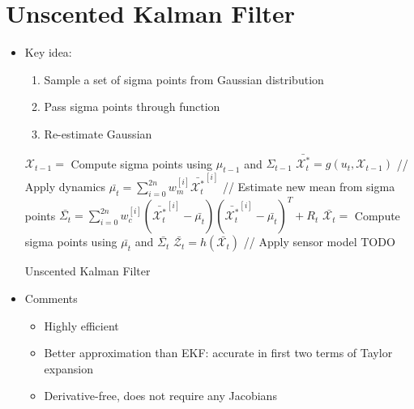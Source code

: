 \documentclass[../main.tex]{subfiles}
\begin{document}
\section{Unscented Kalman Filter}
  \begin{itemize}
    \item Key idea:
      \begin{enumerate}
        \item Sample a set of sigma points from Gaussian distribution
        \item Pass sigma points through function
        \item Re-estimate Gaussian
      \end{enumerate}
    \begin{algorithm}[H]
        \SetAlgoLined
        $\mathcal{X}_{t-1} = $ Compute sigma points using $\mu_{t-1}$ and $\Sigma_{t-1}$\;
        $\bar{\mathcal{X}_{t}^{*}} = g(u_{t}, \mathcal{X}_{t-1})$ // Apply dynamics \;
        $\bar{\mu_{t}} = \sum_{i=0}^{2n} w_{m}^{[i]} \bar{\mathcal{X}_{t}^{*}}^{[i]}$ // Estimate new mean from sigma points\;
        $\bar{\Sigma_{t}} = \sum_{i=0}^{2n} w_{c}^{[i]} (\bar{\mathcal{X}_{t}^{*}}^{[i]} - \bar{\mu_{t}})(\bar{\mathcal{X}_{t}^{*}}^{[i]} - \bar{\mu_{t}})^{T} + R_{t}$\;
        $\bar{\mathcal{X}_{t}} = $ Compute sigma points using $\bar{\mu_{t}}$ and $\bar{\Sigma_{t}}$\;
        $\bar{\mathcal{Z}_{t}} = h(\bar{\mathcal{X}_{t}})$ // Apply sensor model\;
        TODO\;
        \caption{Unscented Kalman Filter}
    \end{algorithm}
    \item Comments
      \begin{itemize}
        \item Highly efficient
        \item Better approximation than EKF: accurate in first two terms of Taylor expansion
        \item Derivative-free, does not require any Jacobians
      \end{itemize}
  \end{itemize}
\end{document}
